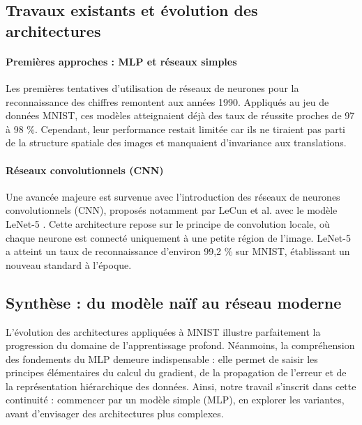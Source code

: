 \documentclass[a4paper,11pt]{article}
\begin{document}
\subsection{Travaux existants et évolution des architectures}

\paragraph{Premières approches : MLP et réseaux simples}
Les premières tentatives d'utilisation de réseaux de neurones pour la reconnaissance des chiffres remontent aux années 1990.
Appliqués au jeu de données MNIST, ces modèles atteignaient déjà des taux de réussite proches de 97 à 98 \%. Cependant, leur performance restait limitée car ils ne tiraient pas parti de la structure spatiale des images et manquaient d'invariance aux translations.

\paragraph{Réseaux convolutionnels (CNN)}
Une avancée majeure est survenue avec l'introduction des réseaux de neurones convolutionnels (CNN), proposés notamment par LeCun et al. avec le modèle LeNet-5 \cite{lecun1998}.
Cette architecture repose sur le principe de convolution locale, où chaque neurone est connecté uniquement à une petite région de l'image. LeNet-5 a atteint un taux de reconnaissance d'environ 99,2 \% sur MNIST, établissant un nouveau standard à l'époque.

\subsection{Synthèse : du modèle naïf au réseau moderne}
L'évolution des architectures appliquées à MNIST illustre parfaitement la progression du domaine de l'apprentissage profond.
Néanmoins, la compréhension des fondements du MLP demeure indispensable : elle permet de saisir les principes élémentaires du calcul du gradient, de la propagation de l'erreur et de la représentation hiérarchique des données.
Ainsi, notre travail s'inscrit dans cette continuité : commencer par un modèle simple (MLP), en explorer les variantes, avant d'envisager des architectures plus complexes.
\end{document}
